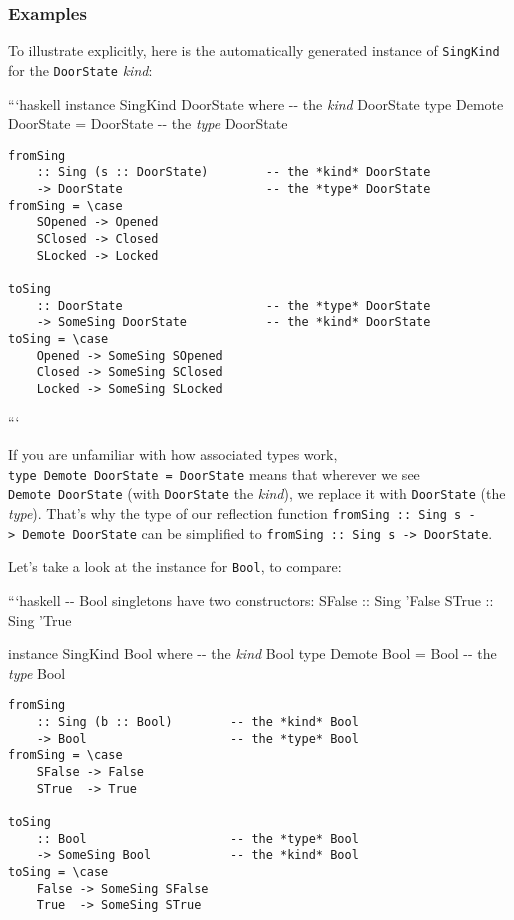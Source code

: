 \documentclass[]{article}
\begin{document}
\subsubsection{Examples}

To illustrate explicitly, here is the automatically generated instance of
\texttt{SingKind} for the \texttt{DoorState} \emph{kind}:

```haskell instance SingKind DoorState where -\/- the \emph{kind} DoorState type
Demote DoorState = DoorState -\/- the \emph{type} DoorState

\begin{verbatim}
fromSing
    :: Sing (s :: DoorState)        -- the *kind* DoorState
    -> DoorState                    -- the *type* DoorState
fromSing = \case
    SOpened -> Opened
    SClosed -> Closed
    SLocked -> Locked

toSing
    :: DoorState                    -- the *type* DoorState
    -> SomeSing DoorState           -- the *kind* DoorState
toSing = \case
    Opened -> SomeSing SOpened
    Closed -> SomeSing SClosed
    Locked -> SomeSing SLocked
\end{verbatim}

```

If you are unfamiliar with how associated types work,
\texttt{type\ Demote\ DoorState\ =\ DoorState} means that wherever we see
\texttt{Demote\ DoorState} (with \texttt{DoorState} the \emph{kind}), we replace
it with \texttt{DoorState} (the \emph{type}). That's why the type of our
reflection function
\texttt{fromSing\ ::\ Sing\ s\ -\textgreater{}\ Demote\ DoorState} can be
simplified to \texttt{fromSing\ ::\ Sing\ s\ -\textgreater{}\ DoorState}.

Let's take a look at the instance for \texttt{Bool}, to compare:

```haskell -\/- Bool singletons have two constructors: SFalse :: Sing 'False
STrue :: Sing 'True

instance SingKind Bool where -\/- the \emph{kind} Bool type Demote Bool = Bool
-\/- the \emph{type} Bool

\begin{verbatim}
fromSing
    :: Sing (b :: Bool)        -- the *kind* Bool
    -> Bool                    -- the *type* Bool
fromSing = \case
    SFalse -> False
    STrue  -> True

toSing
    :: Bool                    -- the *type* Bool
    -> SomeSing Bool           -- the *kind* Bool
toSing = \case
    False -> SomeSing SFalse
    True  -> SomeSing STrue
\end{verbatim}
\end{document}
